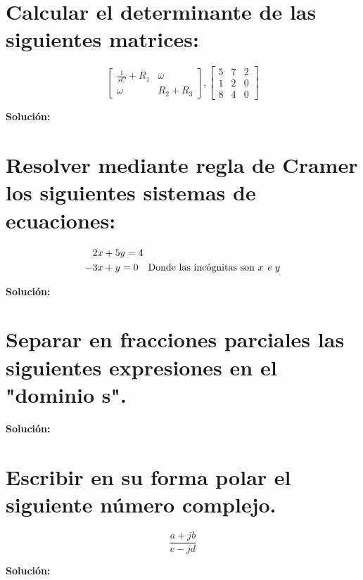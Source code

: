 \documentclass[
    spanish, %
    letterpaper, 
    oneside
]{exam}
\begin{document}
\begin{questions}

\begin{parts}
    \part{Calcular el determinante de las siguientes matrices:}
\[
\begin{bmatrix}
    \frac{1}{sC} + R_1 & \omega \\
    \omega & R_2 + R_3
\end{bmatrix},
\begin{bmatrix}
    5 & 7 & 2 \\
    1 & 2 & 0 \\
    8 & 4 & 0
\end{bmatrix}
\]
\begin{mdframed}
\textbf{Solución:}

\end{mdframed}

\part{Resolver mediante regla de Cramer los siguientes sistemas de ecuaciones:}

\begin{equation*}
\begin{aligned}
    &2x + 5y = 4 \\
    -&3x + y = 0 \quad \text{Donde las incógnitas son \textit{\(x\) e \(y\)}}
\end{aligned}
\end{equation*}

\begin{mdframed}
\textbf{Solución:}

\end{mdframed}

\part{Separar en fracciones parciales las siguientes expresiones en el "dominio s".}
\begin{mdframed}
\textbf{Solución:}
\end{mdframed}

\part{Escribir en su forma polar el siguiente número complejo.}
\[
\frac{a + jb}{c - jd}
\]
\begin{mdframed}
\textbf{Solución:}
\end{mdframed}
\end{parts}
\end{questions}
\end{document}
